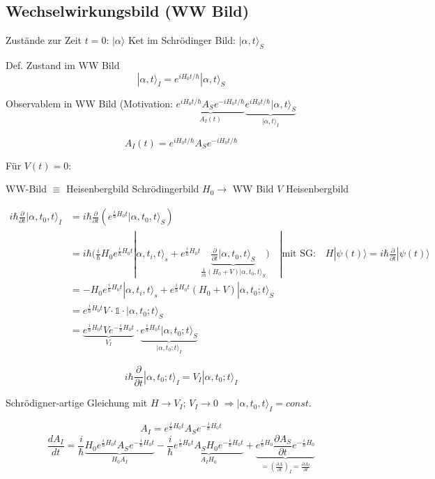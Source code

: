 \subsection{Wechselwirkungsbild (WW Bild)}

Zustände zur Zeit \(t=0\): \(|\alpha\rangle\) Ket im Schrödinger Bild: \(|\alpha,t\rangle_S\)

Def. Zustand im WW Bild
\[ |\alpha,t\rangle_I = e^{iH_0t/\hbar}|\alpha,t\rangle_S\]

Observablem in WW Bild (Motivation: \(\underbrace{e^{iH_0t/\hbar} A_S e^{-iH_0t/\hbar}}_{A_I(t)} \underbrace{e^{iH_0t/\hbar}|\alpha,t\rangle_S}_{|\alpha,t\rangle_I}\)

\[ A_I(t) =  e^{iH_0t/\hbar} A_S e^{-iH_0t/\hbar} \]

Für \(V(t)=0\):

WW-Bild \(\equiv\) Heisenbergbild Schrödingerbild \(H_0\rightarrow\) WW Bild \(V\) Heisenbergbild

\begin{align} 
i\hbar \frac{\partial}{\partial t}|\alpha,t_0,t\rangle_I &= i\hbar \frac{\partial}{\partial t}(e^{\frac{i}{\hbar}H_0t}|\alpha,t_0,t\rangle_S)\\
&= i\hbar(\frac{i}{\hbar}H_0 e^{\frac{i}{\hbar}H_0 t}|\alpha,t_i,t\rangle_s +  e^{\frac{i}{\hbar}H_0t}\underbrace{\frac{\partial}{\partial t}|\alpha,t_0,t\rangle_S}_{\frac{1}{i\hbar}(H_0+V)|\alpha,t_0,t\rangle_S} ) \quad |\text{mit SG:}\quad H|\psi(t)\rangle=i\hbar \frac{\partial}{\partial t}|\psi(t)\rangle    \\
&= -H_0 e^{\frac{i}{\hbar}H_0 t}|\alpha,t_i,t\rangle_s + e^{\frac{i}{\hbar}H_0t}(H_0+V)|\alpha,t_0;t\rangle_S\\
&= e^{\frac{i}{\hbar}H_0t}V\cdot\mathbb 1\cdot|\alpha,t_0;t\rangle_S\\
&= \underbrace{e^{\frac{i}{\hbar}H_0t}Ve^{-\frac{i}{\hbar}H_0t}}_{V_I}\cdot \underbrace{e^{\frac{i}{\hbar}H_0t}|\alpha,t_0;t\rangle_S}_{|\alpha,t_0;t\rangle_I}
\end{align}



\[\boxed{i\hbar \frac{\partial}{\partial t} |\alpha,t_0;t\rangle_I = V_I|\alpha,t_0;t\rangle_I}\]

Schrödigner-artige Gleichung mit \(H\rightarrow V_I\); \(V_I\rightarrow 0\) \(\Rightarrow |\alpha,t_0,t\rangle_I=const.\)

\[A_I = e^{\frac{i}{\hbar}H_0t}A_Se^{-\frac{i}{\hbar}H_0t}\]
\[\frac{d A_I}{d t} = \frac{i}{\hbar} \underbrace{H_0e^{\frac{i}{\hbar}H_0t} A_Se^{-\frac{i}{\hbar}H_0t} }_{H_0A_I} -  \frac{i}{\hbar} \underbrace{e^{\frac{i}{\hbar}H_0t}A_S H_0e^{-\frac{i}{\hbar}H_0t}}_{A_I H_0}+\underbrace{e^{\frac{i}{\hbar}H_0} \frac{\partial A_S}{\partial t} e^{-\frac{i}{\hbar}H_0}}_{=\left(\frac{\partial A}{\partial t}\right)_I=\frac{\partial A_I}{\partial t}}\]

